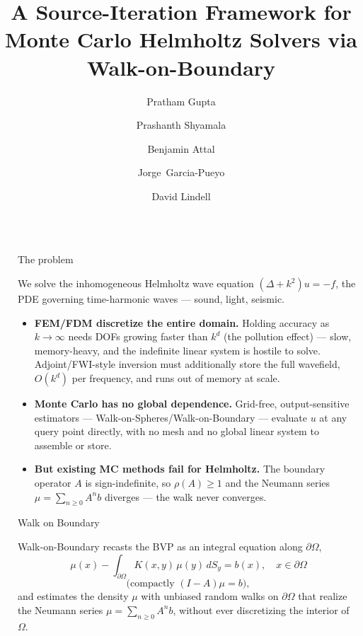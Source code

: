 \documentclass[final]{beamer}
\title{A Source-Iteration Framework for Monte Carlo Helmholtz Solvers via Walk-on-Boundary}
\author{Pratham Gupta\inst{1} \and Prashanth Shyamala\inst{2} \and Benjamin Attal\inst{2} \and Jorge~Garcia-Pueyo\inst{3} \and David Lindell\inst{2}}
\institute{\textsuperscript{1}Indian Institute of Science \quad \textsuperscript{2}University of Toronto \quad \textsuperscript{3}University of Zaragoza}
\newlength{\sepwidth}
\newlength{\colwidthleft}
\newcommand{\separatorcolumn}{\begin{column}{\sepwidth}\end{column}}
\begin{document}
\nocite{Sawhney2020,Sugimoto2023,Osnabrugge2016,Yang2017,Jakob2022}

\begin{frame}[t]

	\begin{columns}[t]
		\separatorcolumn

		\begin{column}{\colwidthleft}

			\begin{block}{The problem}

				We solve the inhomogeneous Helmholtz wave equation $(\Delta + k^2)u = -f$, the PDE governing time-harmonic waves --- sound, light, seismic.

				\begin{itemize}
					\item \textbf{FEM/FDM discretize the entire domain.} Holding accuracy as $k \to \infty$ needs DOFs growing faster than $k^d$ (the pollution effect) --- slow, memory-heavy, and the indefinite linear system is hostile to solve. Adjoint/FWI-style inversion must additionally store the full wavefield, $O(k^d)$ per frequency, and runs out of memory at scale.
					\item \textbf{Monte Carlo has no global dependence.} Grid-free, output-sensitive estimators --- Walk-on-Spheres/Walk-on-Boundary \parencite{Sawhney2020} --- evaluate $u$ at any query point directly, with no mesh and no global linear system to assemble or store.
					\item \textbf{But existing MC methods fail for Helmholtz.} The boundary operator $A$ is sign-indefinite, so $\rho(A) \ge 1$ and the Neumann series $\mu = \sum_{n\ge0} A^n b$ diverges --- the walk never converges.
				\end{itemize}

			\end{block}

			\begin{block}{Walk on Boundary}

				Walk-on-Boundary recasts the BVP as an integral equation along $\partial\Omega$,
				$$\mu(x) - \int_{\partial\Omega} K(x,y)\,\mu(y)\,dS_y = b(x), \quad x \in \partial\Omega$$
				$$\big(\text{compactly } (I-A)\mu = b\big),$$
				and estimates the density $\mu$ with unbiased random walks on $\partial\Omega$ that realize the Neumann series $\mu = \sum_{n \ge 0} A^n b$, without ever discretizing the interior of $\Omega$.


\end{block}
\end{column}
\end{columns}
\end{frame}
\end{document}
